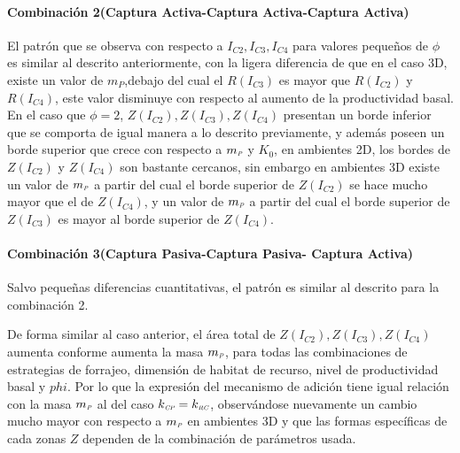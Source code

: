 \paragraph*{Combinaci\'on 2(Captura Activa-Captura Activa-Captura Activa)}
El patr\'on que se observa con respecto a $I_{C2},I_{C3},I_{C4}$  para valores peque\~nos de $\phi$ es similar al descrito anteriormente, con la ligera diferencia de que en el caso 3D, existe un valor de $m_P$,debajo del cual el $R(I_{C3})$ es mayor que $R(I_{C2})$ y $R(I_{C4})$, este valor disminuye con respecto al aumento de la productividad basal.\\
En el caso que $\phi=2$, $Z(I_{C2}),Z(I_{C3}),Z(I_{C4})$ presentan un borde inferior que se comporta de igual manera a lo descrito previamente, y adem\'as poseen un borde superior que crece con respecto a $m_{\textit{\tiny P}}$ y $K_0$, en ambientes 2D, los bordes de $Z(I_{C2})$ y $Z(I_{C4})$ son bastante cercanos, sin embargo en ambientes 3D existe un valor de $m_{\textit{\tiny P}}$ a partir del cual el borde superior de $Z(I_{C2})$ se hace mucho mayor que el de $Z(I_{C4})$,  y un valor de $m_{\textit{\tiny P}}$ a partir del cual el borde superior de $Z(I_{C3})$ es mayor al borde superior de $Z(I_{C4})$.

\paragraph*{Combinaci\'on 3(Captura Pasiva-Captura Pasiva- Captura Activa)}
Salvo peque\~nas diferencias cuantitativas, el patr\'on es similar al descrito para la combinaci\'on 2.

De forma similar al caso anterior, el \'area total de $Z(I_{C2}),Z(I_{C3}),Z(I_{C4})$ aumenta conforme aumenta la masa $m_{\textit{\tiny P}}$, para todas las combinaciones de estrategias de forrajeo, dimensi\'on de habitat de recurso, nivel de productividad basal y $phi$. Por lo que la expresi\'on del mecanismo de adici\'on tiene igual relaci\'on con la masa $m_{\textit{\tiny P}}$ al del caso $k_{\textit{\tiny CP}}= k_{\textit{\tiny RC}}$, observ\'andose nuevamente un cambio mucho mayor con respecto a $m_{\textit{\tiny P}}$ en ambientes 3D y que las formas espec\'ificas de cada zonas $Z$ dependen de la combinaci\'on de par\'ametros usada.

